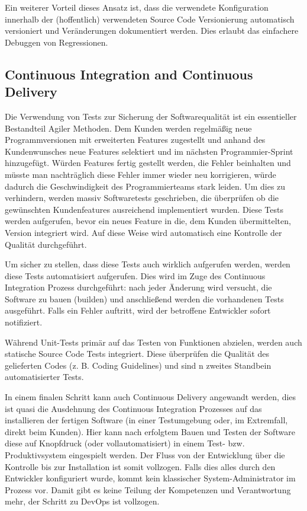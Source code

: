 Ein weiterer Vorteil dieses Ansatz ist, dass die verwendete Konfiguration innerhalb der (hoffentlich) verwendeten Source Code Versionierung automatisch versioniert und Veränderungen dokumentiert werden. Dies erlaubt das einfachere Debuggen von Regressionen.

\subsection{Continuous Integration and Continuous Delivery}

Die Verwendung von Tests zur Sicherung der Softwarequalität ist ein essentieller Bestandteil Agiler Methoden. Dem Kunden werden regelmäßig neue Programmversionen mit erweiterten Features zugestellt und anhand des Kundenwunsches neue Features selektiert und im nächsten Programmier-Sprint hinzugefügt. Würden Features fertig gestellt werden, die Fehler beinhalten und müsste man nachträglich diese Fehler immer wieder neu korrigieren, würde dadurch die Geschwindigkeit des Programmierteams stark leiden. Um dies zu verhindern, werden massiv Softwaretests geschrieben, die überprüfen ob die gewünschten Kundenfeatures ausreichend implementiert wurden. Diese Tests werden aufgerufen, bevor ein neues Feature in die, dem Kunden übermittelten, Version integriert wird. Auf diese Weise wird automatisch eine Kontrolle der Qualität durchgeführt.

Um sicher zu stellen, dass diese Tests auch wirklich aufgerufen werden, werden diese Tests automatisiert aufgerufen. Dies wird im Zuge des Continuous Integration Prozess durchgeführt: nach jeder Änderung wird versucht, die Software zu bauen (builden) und anschließend werden die vorhandenen Tests ausgeführt. Falls ein Fehler auftritt, wird der betroffene Entwickler sofort notifiziert.

Während Unit-Tests primär auf das Testen von Funktionen abzielen, werden auch statische Source Code Tests integriert. Diese überprüfen die Qualität des gelieferten Codes (z. B. Coding Guidelines) und sind n zweites Standbein automatisierter Tests.

In einem finalen Schritt kann auch Continuous Delivery angewandt werden, dies ist quasi die Ausdehnung des Continuous Integration Prozesses auf das installieren der fertigen Software (in einer Testumgebung oder, im Extremfall, direkt beim Kunden). Hier kann nach erfolgtem Bauen und Testen der Software diese auf Knopfdruck (oder vollautomatisiert) in einem Test- bzw. Produktivsystem eingespielt werden. Der Fluss von der Entwicklung über die Kontrolle bis zur Installation ist somit vollzogen. Falls dies alles durch den Entwickler konfiguriert wurde, kommt kein klassischer System-Administrator im Prozess vor. Damit gibt es keine Teilung der Kompetenzen und Verantwortung mehr, der Schritt zu DevOps ist vollzogen. 


